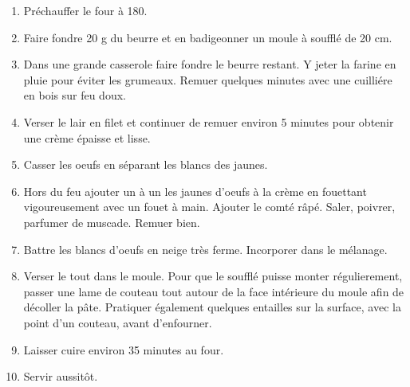 
\begin{ingredients}
\end{ingredients}


\begin{recipe}
  \begin{enumerate}

  \item Pr\'echauffer le four \`a 180\degreeC.

  \item Faire fondre 20 g du beurre et en badigeonner un moule \`a
    souffl\'e de 20 cm.

  \item Dans une grande casserole faire fondre le beurre restant.  Y
    jeter la farine en pluie pour \'eviter les grumeaux.  Remuer
    quelques minutes avec une cuilli\'ere en bois sur feu doux.

  \item Verser le lair en filet et continuer de remuer environ 5
    minutes pour obtenir une cr\`eme \'epaisse et lisse.

  \item Casser les oeufs en s\'eparant les blancs des jaunes.

  \item Hors du feu ajouter un \`a un les jaunes d'oeufs \`a la
    cr\`eme en fouettant vigoureusement avec un fouet \`a main.
    Ajouter le comt\'e r\^ap\'e.  Saler, poivrer, parfumer de
    muscade.  Remuer bien.

  \item Battre les blancs d'oeufs en neige tr\`es ferme.  Incorporer
    dans le m\'elanage.

  \item Verser le tout dans le moule.  Pour que le souffl\'e puisse
    monter r\'egulierement, passer une lame de couteau tout autour de
    la face int\'erieure du moule afin de d\'ecoller la p\^ate.
    Pratiquer \'egalement quelques entailles sur la surface, avec la
    point d'un couteau, avant d'enfourner.

  \item Laisser cuire environ 35 minutes au four.

  \item Servir aussit\^ot.

  \end{enumerate}
\end{recipe}
